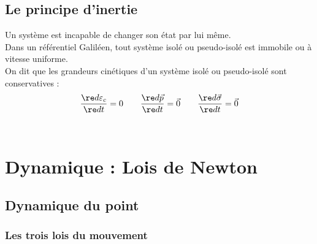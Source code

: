 \documentclass[13pt, twoside, a4paper, french]{report}
\begin{document}
    
    
    \section{Le principe d'inertie}\label{sec:le-principe-d'inertie}
        
        Un système est incapable de changer son état par lui même.\\
        Dans un référentiel Galiléen, tout système isolé ou pseudo-isolé est immobile ou à vitesse uniforme.\\
        
        On dit que les grandeurs cinétiques d'un système isolé ou pseudo-isolé sont conservatives :\\
        \[\dfrac{\re d \varepsilon_c}{\re d t} = 0 \quad\quad \dfrac{\re d \vec p}{\re d t} = \vec 0 \quad\quad \dfrac{\re d \vec \sigma}{\re d t} = \vec 0\]\\


\chapter{Dynamique : Lois de Newton}\label{ch:dynamique-lois-de-newton}
    
    
    \section{Dynamique du point}\label{sec:dynamique-du-point}
        
        \subsection{Les trois lois du mouvement}\label{subsec:les-trois-lois-du-mouvement}
            
\end{document}
